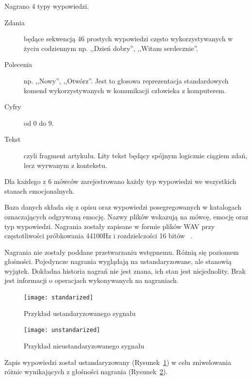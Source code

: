 \documentclass[a4paper,12pt,twoside,openany]{report}
\newcommand{\Rys}[1]{(Rysunek~\ref{#1})}
\begin{document}
Nagrano 4 typy wypowiedzi.
\begin{description}
	\item [Zdania] będące sekwencją 46 prostych wypowiedzi często wykorzystywanych w życiu codziennym 
		np. ,,Dzień dobry'', ,,Witam serdecznie''. 
	\item [Polecenia]  np. ,,Nowy'', ,,Otwórz''. 
		Jest to głosowa reprezentacja standardowych komend wykorzystywanych w komunikacji człowieka z komputerem.
	\item [Cyfry] od 0 do 9.
	\item [Tekst] czyli fragment artykułu. 
		Lity tekst będący spójnym logicznie ciągiem zdań, lecz wyrwanym z kontekstu.
\end{description}
Dla każdego z 6 mówców zarejestrowano każdy typ wypowiedzi we wszystkich stanach emocjonalnych.

Baza danych składa się z opisu oraz wypowiedzi posegregowanych w katalogach oznaczających odgrywaną emocję.
Nazwy plików wskazują na mówcę, emocję oraz typ wypowiedzi.
Nagrania zostały zapisane w formie plików WAV przy częstotliwości próbkowania 44100Hz i rozdzielczości 16 bitów ~\cite{Igras2009}.

Nagrania nie zostały poddane przetwarzaniu wstępnemu. 
Różnią się poziomem głośności.
Pojedyncze nagrania wyglądają na ustandaryzowane, ale stanowią wyjątek.
Dokładna historia nagrań nie jest znana, ich stan jest niejednolity.
Brak jest informacji o operacjach wykonywanych na nagraniach.
\begin{figure}[h]
	\centering
	\texttt{[image: standarized]}
	\caption{Przykład ustandaryzowanego sygnału}
	\label{rys:opis:ustandaryzowany}
\end{figure}
\begin{figure}[h]
	\centering
	\texttt{[image: unstandarized]}
	\caption{Przykład nieustandaryzowanego sygnału}
	\label{rys:opis:nieustandaryzowany}
\end{figure}

Zapis wypowiedzi został ustandaryzowany \Rys{rys:opis:ustandaryzowany} w celu zniwelowania różnic wynikających z głośności nagrania \Rys{rys:opis:nieustandaryzowany}.
\end{document}
